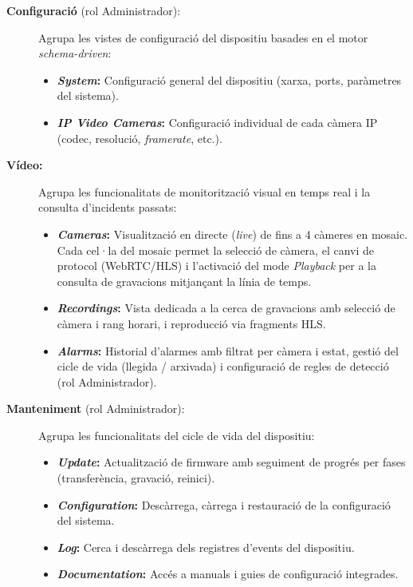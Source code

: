 \begin{description}
  \item[\textbf{Configuració} (rol Administrador):] Agrupa les vistes de configuració del dispositiu basades en el motor \textit{schema-driven}:
        \begin{itemize}
          \item \textbf{\textit{System}:} Configuració general del dispositiu (xarxa, ports, paràmetres del sistema).
          \item \textbf{\textit{IP Video Cameras}:} Configuració individual de cada càmera IP (codec, resolució, \textit{framerate}, etc.).
        \end{itemize}
  \item[\textbf{Vídeo:}] Agrupa les funcionalitats de monitorització visual en temps real i la consulta d'incidents passats:
        \begin{itemize}
          \item \textbf{\textit{Cameras}:} Visualització en directe (\textit{live}) de fins a 4 càmeres en mosaic. Cada cel·la del mosaic permet la selecció de càmera, el canvi de protocol (WebRTC/HLS) i l'activació del mode \textit{Playback} per a la consulta de gravacions mitjançant la línia de temps.
          \item \textbf{\textit{Recordings}:} Vista dedicada a la cerca de gravacions amb selecció de càmera i rang horari, i reproducció via fragments HLS.
          \item \textbf{\textit{Alarms}:} Historial d'alarmes amb filtrat per càmera i estat, gestió del cicle de vida (llegida / arxivada) i configuració de regles de detecció (rol Administrador).
        \end{itemize}
  \item[\textbf{Manteniment} (rol Administrador):] Agrupa les funcionalitats del cicle de vida del dispositiu:
        \begin{itemize}
          \item \textbf{\textit{Update}:} Actualització de firmware amb seguiment de progrés per fases (transferència, gravació, reinici).
          \item \textbf{\textit{Configuration}:} Descàrrega, càrrega i restauració de la configuració del sistema.
          \item \textbf{\textit{Log}:} Cerca i descàrrega dels registres d'events del dispositiu.
          \item \textbf{\textit{Documentation}:} Accés a manuals i guies de configuració integrades.
        \end{itemize}
\end{description}

